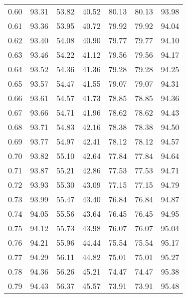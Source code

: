 \begin{tabular}{|c|c|c|c|c|c|c|}
      0.60 &     93.31 &     53.82 &      40.52 &   80.13 &      80.13 &         93.98 \\
      0.61 &     93.36 &     53.95 &      40.72 &   79.92 &      79.92 &         94.04 \\
      0.62 &     93.40 &     54.08 &      40.90 &   79.77 &      79.77 &         94.10 \\
      0.63 &     93.46 &     54.22 &      41.12 &   79.56 &      79.56 &         94.17 \\
      0.64 &     93.52 &     54.36 &      41.36 &   79.28 &      79.28 &         94.25 \\
      0.65 &     93.57 &     54.47 &      41.55 &   79.07 &      79.07 &         94.31 \\
      0.66 &     93.61 &     54.57 &      41.73 &   78.85 &      78.85 &         94.36 \\
      0.67 &     93.66 &     54.71 &      41.96 &   78.62 &      78.62 &         94.43 \\
      0.68 &     93.71 &     54.83 &      42.16 &   78.38 &      78.38 &         94.50 \\
      0.69 &     93.77 &     54.97 &      42.41 &   78.12 &      78.12 &         94.57 \\
      0.70 &     93.82 &     55.10 &      42.64 &   77.84 &      77.84 &         94.64 \\
      0.71 &     93.87 &     55.21 &      42.86 &   77.53 &      77.53 &         94.71 \\
      0.72 &     93.93 &     55.30 &      43.09 &   77.15 &      77.15 &         94.79 \\
      0.73 &     93.99 &     55.47 &      43.40 &   76.84 &      76.84 &         94.87 \\
      0.74 &     94.05 &     55.56 &      43.64 &   76.45 &      76.45 &         94.95 \\
      0.75 &     94.12 &     55.73 &      43.98 &   76.07 &      76.07 &         95.04 \\
      0.76 &     94.21 &     55.96 &      44.44 &   75.54 &      75.54 &         95.17 \\
      0.77 &     94.29 &     56.11 &      44.82 &   75.01 &      75.01 &         95.27 \\
      0.78 &     94.36 &     56.26 &      45.21 &   74.47 &      74.47 &         95.38 \\
      0.79 &     94.43 &     56.37 &      45.57 &   73.91 &      73.91 &         95.48 \\

\end{tabular}
